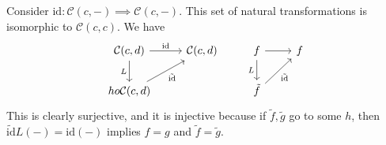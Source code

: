\documentclass[name=Narendran, andrewid=narendran, course=eCHT, num=1]{homework}
\begin{document}
Consider $\mathrm{id} : \mathcal{C}(c,-)\implies \mathcal{C}(c,-)$. This set of natural transformations is isomorphic to $\mathcal{C}(c,c)$. We have
\[
    \begin{tikzcd}
{\mathcal{C}(c,d)} \arrow[r, "\mathrm{id}"] \arrow[d, "L"'] & {\mathcal{C}(c,d)} & f \arrow[d, "L"'] \arrow[r]         & f \\
{ho\mathcal{C}(c,d)} \arrow[ru, "\tilde{\mathrm{id}}"']     &                    & \tilde{f} \arrow[ru, "\tilde{\mathrm{id }}"'] &  
\end{tikzcd}
\]
This is clearly surjective, and it is injective because if $\tilde{f }, \tilde{g }$ go to some $h$, then $\tilde{\mathrm{id} }L (-)=\mathrm{id } (-)$ implies $f=g$ and $\tilde{f }=\tilde{g }$. 
\separator
\end{document}
